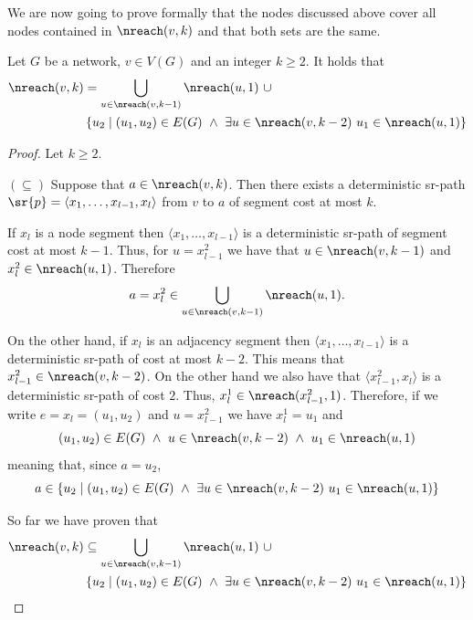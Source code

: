 We are now going to prove formally that the nodes discussed above cover all nodes
contained in $\nreach(v, k)$ and that both sets are the same.

\begin{theorem}
\label{thm:nreach}
Let $G$ be a network, $v \in V(G)$ and an integer $k \geq 2$. It holds that
\begin{align*}
\nreach(v, k) & = \bigcup_{u \in \nreach(v, k - 1)} \nreach(u, 1) \ \cup \\ 
& \left\{ u_2 \mid (u_1, u_2) \in E(G) \ \wedge \ \exists u \in \nreach(v, k - 2) \ u_1 \in \nreach(u, 1) \right\}
\end{align*}
\end{theorem}

\begin{proof}
Let $k \geq 2$. 

$(\subseteq)$ Suppose that $a \in \nreach(v, k)$. Then there exists a deterministic sr-path 
$\sr{p} = \langle x_1, \ldots, x_{l - 1}, x_l \rangle$ from $v$ to $a$ of segment cost at most $k$.

If $x_l$ is a node segment then $\langle x_1, \ldots, x_{l - 1} \rangle$
is a deterministic sr-path of segment cost at most $k - 1$. Thus, for $u = x^2_{l - 1}$ we have
that $u \in \nreach(v, k - 1)$ and $x^2_l \in \nreach(u, 1)$. Therefore
$$
a = x^2_l \in \bigcup_{u \in \nreach(v, k - 1)} \nreach(u, 1).
$$

On the other hand, if $x_l$ is an adjacency segment then $\langle x_1, \ldots, x_{l - 1} \rangle$
is a deterministic sr-path of cost at most $k - 2$. This means that
$x^2_{l - 1} \in \nreach(v, k - 2)$. On the other hand we also have that 
$\langle x^2_{l - 1}, x_l \rangle$ is a deterministic
sr-path of cost $2$. Thus, $x^1_l \in \nreach(x^2_{l - 1}, 1)$. 
Therefore, if we write $e = x_l = (u_1, u_2)$ and $u = x^2_{l - 1}$ we have 
$x^1_l = u_1$ and
$$
(u_1, u_2) \in E(G) \ \wedge \ u \in \nreach(v, k - 2) \ \wedge \ u_1 \in \nreach(u, 1)
$$
meaning that, since $a = u_2$,
$$
a \in \left\{ u_2 \mid (u_1, u_2) \in E(G) \ \wedge \ \exists u \in \nreach(v, k - 2) \ u_1 \in \nreach(u, 1) \right\}
$$

So far we have proven that
\begin{align*}
\nreach(v, k) & \subseteq \bigcup_{u \in \nreach(v, k - 1)} \nreach(u, 1) \ \cup \\ 
& \left\{ u_2 \mid (u_1, u_2) \in E(G) \ \wedge \ \exists u \in \nreach(v, k - 2) \ u_1 \in \nreach(u, 1) \right\}
\end{align*}


\end{proof}
